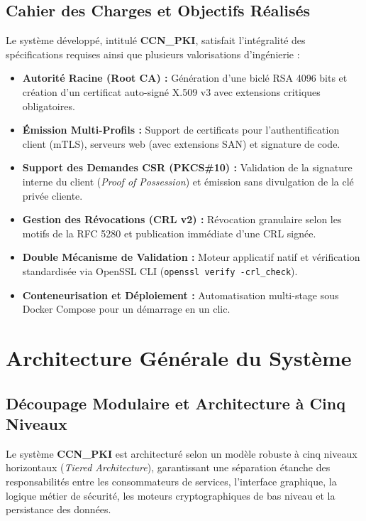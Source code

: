 \documentclass[12pt,a4paper]{report}
\begin{document}
\section{Cahier des Charges et Objectifs Réalisés}
Le système développé, intitulé \textbf{CCN\_PKI}, satisfait l'intégralité des spécifications requises ainsi que plusieurs valorisations d'ingénierie :
\begin{itemize}
    \item \textbf{Autorité Racine (Root CA) :} Génération d'une biclé RSA 4096 bits et création d'un certificat auto-signé X.509 v3 avec extensions critiques obligatoires.
    \item \textbf{Émission Multi-Profils :} Support de certificats pour l'authentification client (mTLS), serveurs web (avec extensions SAN) et signature de code.
    \item \textbf{Support des Demandes CSR (PKCS\#10) :} Validation de la signature interne du client (\textit{Proof of Possession}) et émission sans divulgation de la clé privée cliente.
    \item \textbf{Gestion des Révocations (CRL v2) :} Révocation granulaire selon les motifs de la RFC 5280 et publication immédiate d'une CRL signée.
    \item \textbf{Double Mécanisme de Validation :} Moteur applicatif natif et vérification standardisée via OpenSSL CLI (\texttt{openssl verify -crl\_check}).
    \item \textbf{Conteneurisation et Déploiement :} Automatisation multi-stage sous Docker Compose pour un démarrage en un clic.
\end{itemize}

\chapter{Architecture Générale du Système}

\section{Découpage Modulaire et Architecture à Cinq Niveaux}
Le système \textbf{CCN\_PKI} est architecturé selon un modèle robuste à cinq niveaux horizontaux (\textit{Tiered Architecture}), garantissant une séparation étanche des responsabilités entre les consommateurs de services, l'interface graphique, la logique métier de sécurité, les moteurs cryptographiques de bas niveau et la persistance des données. 
\end{document}
